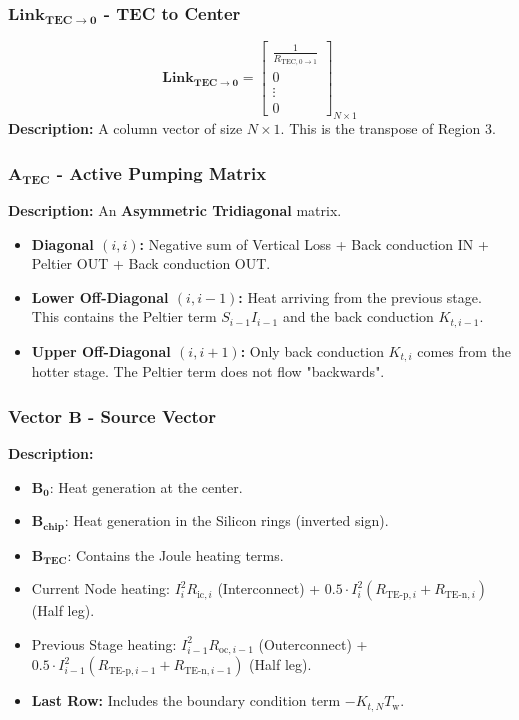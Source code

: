 \documentclass[10pt,a4paper,twocolumn]{article}
\begin{document}
\subsubsection{$\mathbf{Link_{TEC \to 0}}$ - TEC to Center}
$$ \mathbf{Link_{TEC \to 0}} = \begin{bmatrix} \frac{1}{R_{\text{TEC}, 0\to 1}} \\ 0 \\ \vdots \\ 0 \end{bmatrix}_{N \times 1} $$
\textbf{Description:} A column vector of size $N \times 1$. This is the transpose of Region 3.

\subsubsection{$\mathbf{A_{TEC}}$ - Active Pumping Matrix}
\textbf{Description:} An \textbf{Asymmetric Tridiagonal} matrix.
\begin{itemize}
    \item \textbf{Diagonal $(i,i)$:} Negative sum of Vertical Loss + Back conduction IN + Peltier OUT + Back conduction OUT.
    \item \textbf{Lower Off-Diagonal $(i, i-1)$:} Heat arriving from the previous stage. This contains the Peltier term $S_{i-1}I_{i-1}$ and the back conduction $K_{t,i-1}$.
    \item \textbf{Upper Off-Diagonal $(i, i+1)$:} Only back conduction $K_{t,i}$ comes from the hotter stage. The Peltier term does not flow "backwards".
\end{itemize}

\subsubsection{Vector $\mathbf{B}$ - Source Vector}

\textbf{Description:}
\begin{itemize}
    \item $\mathbf{B_{0}}$: Heat generation at the center.
    \item $\mathbf{B_{\text{chip}}}$: Heat generation in the Silicon rings (inverted sign).
    \item $\mathbf{B_{\text{TEC}}}$: Contains the Joule heating terms.
    \item Current Node heating: $I_i^2 R_{\text{ic},i}$ (Interconnect) + $0.5 \cdot I_i^2 (R_{\text{TE-p},i}+R_{\text{TE-n},i})$ (Half leg).
    \item Previous Stage heating: $I_{i-1}^2 R_{\text{oc},i-1}$ (Outerconnect) + $0.5 \cdot I_{i-1}^2 (R_{\text{TE-p},i-1}+R_{\text{TE-n},i-1})$ (Half leg).
    \item \textbf{Last Row:} Includes the boundary condition term $-K_{t,N} T_{\text{w}}$.
\end{itemize}
\end{document}
